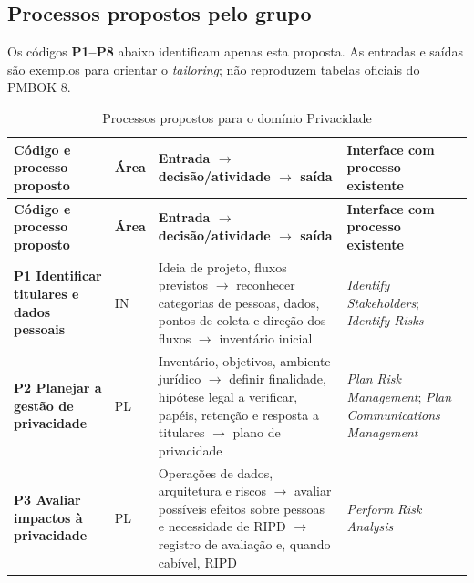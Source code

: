 \documentclass[12pt,a4paper,article,oneside,english,brazil]{abntex2}
\begin{document}
\subsection{Processos propostos pelo grupo}

Os códigos \textbf{P1–P8} abaixo identificam apenas esta proposta. As entradas e saídas são exemplos para orientar o \textit{tailoring}; não reproduzem tabelas oficiais do PMBOK 8.

\begingroup\SingleSpacing\footnotesize
\begin{longtable}{@{}>{\raggedright\arraybackslash}p{}>{\raggedright\arraybackslash}p{}>{\raggedright\arraybackslash}p{}>{\raggedright\arraybackslash}p{}@{}}
\caption{Processos propostos para o domínio Privacidade}\label{tab:t3}\\
\hline
\textbf{Código e processo proposto} & \textbf{Área} & \textbf{Entrada \ensuremath{\rightarrow} decisão/atividade \ensuremath{\rightarrow} saída} & \textbf{Interface com processo existente}\\
\hline
\endfirsthead
\hline
\textbf{Código e processo proposto} & \textbf{Área} & \textbf{Entrada \ensuremath{\rightarrow} decisão/atividade \ensuremath{\rightarrow} saída} & \textbf{Interface com processo existente}\\
\hline
\endhead
\hline
\endfoot
\hline
\endlastfoot
\textbf{P1 Identificar titulares e dados pessoais} & IN & Ideia de projeto, fluxos previstos \ensuremath{\rightarrow} reconhecer categorias de pessoas, dados, pontos de coleta e direção dos fluxos \ensuremath{\rightarrow} inventário inicial & \textit{Identify Stakeholders}; \textit{Identify Risks}\\[3pt]
\textbf{P2 Planejar a gestão de privacidade} & PL & Inventário, objetivos, ambiente jurídico \ensuremath{\rightarrow} definir finalidade, hipótese legal a verificar, papéis, retenção e resposta a titulares \ensuremath{\rightarrow} plano de privacidade & \textit{Plan Risk Management}; \textit{Plan Communications Management}\\[3pt]
\textbf{P3 Avaliar impactos à privacidade} & PL & Operações de dados, arquitetura e riscos \ensuremath{\rightarrow} avaliar possíveis efeitos sobre pessoas e necessidade de RIPD \ensuremath{\rightarrow} registro de avaliação e, quando cabível, RIPD & \textit{Perform Risk Analysis}\\[3pt]

\end{longtable}
\end{document}
